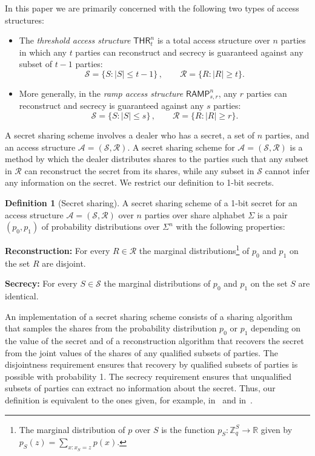 \documentclass[11pt]{article}
\numberwithin{equation}{section}
\theoremstyle{definition}
\newtheorem{definition}[theorem]{Definition}
\theoremstyle{plain}
\newcommand{\thr}[2]{\mathsf{THR}_{#1}^{#2}}
\newcommand{\ramp}[2]{\mathsf{RAMP}_{#1}^{#2}}
\def\calA{\mathcal{A}}
\def\calS{\mathcal{S}}
\def\calR{\mathcal{R}}
\providecommand\abs[1]{\lvert#1\rvert}
\begin{document}
In this paper we are primarily concerned with 
the following two types of access structures:

\begin{itemize}
\item The \emph{threshold access structure} $\thr{t}{n}$ is a total access structure over $n$ parties in which any $t$ parties can reconstruct and secrecy is guaranteed against any subset of $t - 1$ parties:
\[ \calS = \{S\colon \abs{S} \leq t - 1\}\,, \qquad \calR = \{R\colon \abs{R} \geq t\}. \]
\item More generally, in the \emph{ramp access structure} $\ramp{s,r}{n}$, any $r$ parties can reconstruct and secrecy is guaranteed against any $s$ parties:
\[ \calS = \{S\colon \abs{S} \leq s\}\,, \qquad \calR = \{R\colon \abs{R} \geq r\}. \]
\end{itemize}

A secret sharing scheme involves a dealer who has a secret, a set of $n$
parties, and an
%
%
access structure $\calA = (\calS,\calR)$. A secret sharing scheme for $\calA=(\calS,\calR)$ is a method by
which the dealer distributes shares to the parties such that any subset in
$\calR$ can reconstruct the secret from its shares, while any subset in $\calS$
cannot infer any information on the secret.  We restrict our definition to
1-bit secrets.

\begin{definition}[Secret sharing]\label{def:SecretSharing}
A secret sharing scheme of a 1-bit secret for an 
%
%
access structure
$\calA=(\calS,\calR)$ over $n$ parties over share alphabet $\Sigma$ is
%
a pair $(p_0,p_1)$ of probability distributions %
over $\Sigma^n$ with the following properties:
\begin{description}
\item {\bf Reconstruction:} \label{def:ss_correctness} For every $R \in \calR$
the marginal distributions\footnote{The marginal distribution of $p$ over $S$ is the function $p_S\colon \mathbb{Z}_q^S \to \mathbb{R}$ given by $p_S(z) = \sum_{x\colon x_S = z} p(x)$.} 
%
%
of $p_0$ and $p_1$ on the set $R$ are disjoint.
\item {\bf Secrecy:} \label{def:ss_secrecy} For every $S \in \calS$ the marginal
distributions of $p_0$ and $p_1$ on the set $S$ are identical.
\end{description}
\end{definition}

An implementation of a secret sharing scheme consists of a sharing algorithm
that samples the shares from the probability distribution $p_0$ or $p_1$ depending on the value
of the secret and of a reconstruction algorithm that recovers the secret from
the joint values of the shares of any qualified subsets of parties. The disjointness requirement ensures that recovery by qualified subsets of parties is possible with probability 1.  The
secrecy requirement ensures that unqualified subsets of parties can extract no
information about the secret. Thus, our definition is equivalent to the ones
given, for example, in~\cite[Definition 3.6]{BeimelPHD} and in~\cite[Definitions
2 and 3]{Beimel11}.
\end{document}

